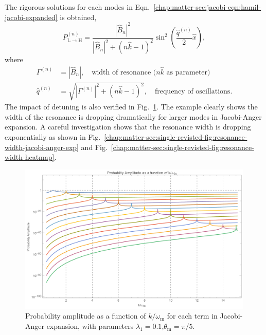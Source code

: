 The rigorous solutions for each modes in Eqn.~\ref{chap:matter-sec:jacobi-eqn:hamil-jacobi-expanded} is obtained,
\begin{equation}
    P_{\mathrm{L}\to\mathrm{H}}^{(n)} = \frac{ \left\lvert \hat B_{n}  \right\rvert^2 }{ \left\lvert   \hat B_{n}  \right\rvert^2 + ( n \hat k - 1 )^2  } \sin^2 \left( \frac{ \hat q^{(n)} }{2} \hat x \right),
\end{equation}
where
\begin{align}
\Gamma^{(n)} &= \left\lvert \hat B_{n} \right\rvert, \quad \text{width of resonance ($n\hat k$ as parameter)} \\
\hat q^{(n)} &= \sqrt{\left\lvert  \Gamma^{(n)} \right\rvert^2 + ( n \hat k - 1 )^2},\quad \text{frequency of oscillations}.
\end{align}
The impact of detuning is also verified in Fig.~\ref{chap:matter-sec:single-revisted-fig:prob-amp-jacobi-anger}. The example clearly shows the width of the resonance is dropping dramatically for larger modes in Jacobi-Anger expansion. A careful investigation shows that the resonance width is dropping exponentially as shown in Fig.~\ref{chap:matter-sec:single-revisted-fig:resonance-width-jacobi-anger-exp} and Fig.~\ref{chap:matter-sec:single-revisted-fig:resonance-width-heatmap}.




\begin{figure}[!htbp]
    \centering
    \includegraphics[width=\textwidth]{chapters/assets/rabi/stimulated-probability-apmlitude-vs-k-Jacobi-Anger.pdf}
    \caption{Probability amplitude as a function of $k/\omega_{\mathrm m}$ for each term in Jacobi-Anger expansion, with parameters $\lambda_1=0.1$,$\theta_{\mathrm m}=\pi/5$.}
    \label{chap:matter-sec:single-revisted-fig:prob-amp-jacobi-anger}
\end{figure}


